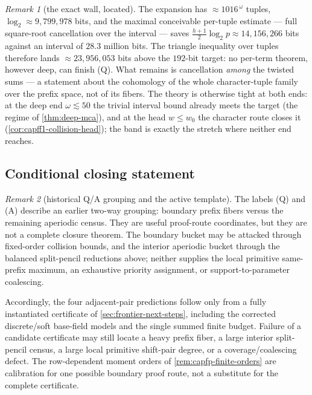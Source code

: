 \documentclass[11pt]{article}
\theoremstyle{definition}
\theoremstyle{remark}
\newtheorem{remark}[remark]{Remark}
\begin{document}
\begin{remark}[the exact wall, located]\label{rem:capfp-Q-wall}
The expansion has $\approx1016^{\,\omega}$ tuples, $\log_2\approx9{,}799{,}978$ bits, and the maximal conceivable per-tuple estimate --- full square-root cancellation over the interval --- saves $\tfrac{h+1}2\log_2p\approx14{,}156{,}266$ bits against an interval of $28.3$ million bits.  The triangle inequality over tuples therefore lands $\approx23{,}956{,}053$ bits above the $192$-bit target: no per-term theorem, however deep, can finish \textup{(Q)}.  What remains is cancellation \emph{among} the twisted sums --- a statement about the cohomology of the whole character-tuple family over the prefix space, not of its fibers.  The theory is otherwise tight at both ends: at the deep end $\omega\lesssim50$ the trivial interval bound already meets the target \textup(the regime of \cref{thm:deep-mca}\textup), and at the head $w\le w_0$ the character route closes it \textup(\cref{cor:capff1-collision-head}\textup); the band is exactly the stretch where neither end reaches.
\end{remark}

\subsection{Conditional closing statement}

\begin{remark}[historical Q/A grouping and the active template]\label{prop:capfp-closing}
The labels \textup{(Q)} and \textup{(A)} describe an earlier two-way grouping: boundary prefix fibers versus the remaining aperiodic census.  They are useful proof-route coordinates, but they are not a complete closure theorem.  The boundary bucket may be attacked through fixed-order collision bounds, and the interior aperiodic bucket through the balanced split-pencil reductions above; neither supplies the local primitive same-prefix maximum, an exhaustive priority assignment, or support-to-parameter coalescing.

Accordingly, the four adjacent-pair predictions follow only from a fully instantiated certificate of \cref{sec:frontier-next-steps}, including the corrected discrete/soft base-field models and the single summed finite budget.  Failure of a candidate certificate may still locate a heavy prefix fiber, a large interior split-pencil census, a large local primitive shift-pair degree, or a coverage/coalescing defect.  The row-dependent moment orders of \cref{rem:capfp-finite-orders} are calibration for one possible boundary proof route, not a substitute for the complete certificate.
\end{remark}
\end{document}
